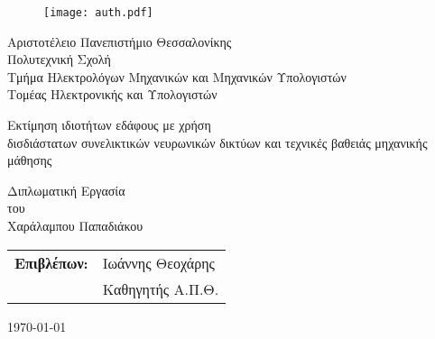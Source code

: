 \begin{titlepage}

\begin{figure}[H]
  \begin{center}
    \texttt{[image: auth.pdf]}
    \label{fig:cover_auth_logo}
  \end{center}
\end{figure}

\centering
\Large Αριστοτέλειο Πανεπιστήμιο Θεσσαλονίκης\\
\Large Πολυτεχνική Σχολή\\
\large Τμήμα Ηλεκτρολόγων Μηχανικών και Μηχανικών Υπολογιστών\\
\large Τομέας Ηλεκτρονικής και Υπολογιστών

\vspace{\fill}

\LARGE Εκτίμηση ιδιοτήτων εδάφους με χρήση\\
\LARGE δισδιάστατων συνελικτικών νευρωνικών δικτύων
\LARGE και τεχνικές βαθειάς μηχανικής μάθησης

\vspace{\fill}

\Large Διπλωματική Εργασία\\
\Large του\\
\Large Χαράλαμπου Παπαδιάκου

\vspace{\fill}
\raggedright

\begin{tabular}{ll}
\textbf{Επιβλέπων:} & Ιωάννης Θεοχάρης\\
 & Καθηγητής Α.Π.Θ.\\
\end{tabular}

\centering
\vspace{\fill}
\today

\end{titlepage}

